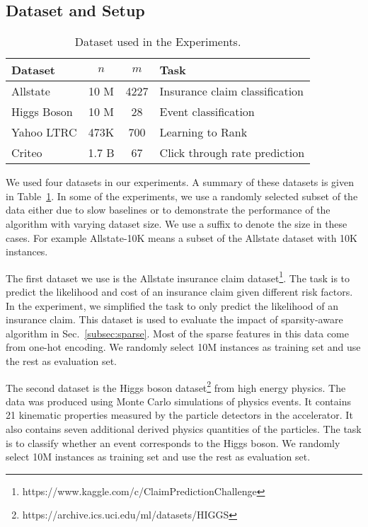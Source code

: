 \documentclass{sig-alternate-05-2015}
\begin{document}
\subsection{Dataset and Setup}\label{subsec:dataset}

\begin{table}
\centering
\caption{Dataset used in the Experiments.}\label{tbl:dataset}
\begin{tabular}{|l|c|c|l|}\hline
  Dataset & $n$ & $m$  & Task  \\ \hline
  Allstate  & 10 M & 4227  & Insurance claim classification \\\hline
  Higgs Boson        & 10 M & 28    & Event classification \\ \hline
  Yahoo LTRC   & 473K & 700  &  Learning to Rank\\\hline
  Criteo       & 1.7 B  & 67   &   Click through rate prediction\\\hline
\end{tabular}
\end{table}
We used four datasets in our experiments. A summary of these datasets is given in Table~\ref{tbl:dataset}.
In some of the experiments, we use a randomly selected subset of the data either due to slow baselines or to demonstrate the performance of the algorithm with varying dataset size.
We use a suffix to denote the size in these cases. For example
Allstate-10K means a subset of the Allstate dataset with 10K instances.

The first dataset we use is the Allstate insurance claim dataset\footnote{https://www.kaggle.com/c/ClaimPredictionChallenge}.
The task is to predict the likelihood and cost of an insurance claim given different risk factors.
In the experiment, we simplified the task to only predict the likelihood of an insurance claim.
This dataset is used to evaluate the impact of sparsity-aware algorithm in Sec.~\ref{subsec:sparse}.
Most of the sparse features in this data come from one-hot encoding.
We randomly select 10M instances as training set and use the rest as evaluation set.

The second dataset is the Higgs boson dataset\footnote{https://archive.ics.uci.edu/ml/datasets/HIGGS} from high energy physics.
The data was produced using Monte Carlo simulations of physics events.
It contains 21 kinematic properties measured by the particle detectors in the accelerator.
It also contains seven additional derived physics quantities of the particles.
The task is to classify whether an event corresponds to the Higgs boson.
We randomly select 10M instances as training set and use the rest as evaluation set.
\end{document}
